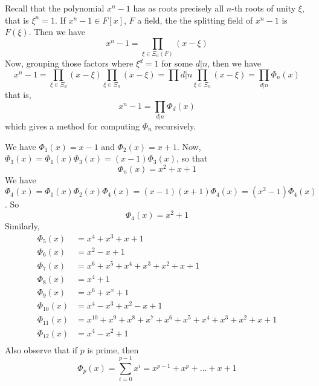 \begin{example}\label{8.18}
  Recall that the polynomial $x^n-1$ has as roots precisely all  $n$-th roots
  of unity  $\xi$, that is $\xi^n=1$. If $x^n-1 \in F[x]$, $F$ a field, the
  the splitting field of  $x^n-1$ is  $F(\xi)$. Then we have
  \begin{equation*}
    x^n-1=\prod_{\xi \in \Xi_n(F)}{(x-\xi)}
  \end{equation*}
  Now, grouping those factors where $\xi^d=1$ for some  $d|n$, then we have
  \begin{equation*}
    x^n-1=\prod_{\xi \in \Xi_d}{(x-\xi)}\prod_{\xi \in \Xi_n}{(x-\xi)}=
    \prod{d|n}{\prod_{\xi \in \Xi_n}{(x-\xi)}}=\prod_{d|n}{\Phi_n(x)}
  \end{equation*}
  that is,
  \begin{equation*}
    x^n-1=\prod_{d|n}{\Phi_d(x)}
  \end{equation*}
  which gives a method for computing $\Phi_n$ recursively.

  We have  $\Phi_1(x)=x-1$ and $\Phi_2(x)=x+1$. Now,
  $\Phi_3(x)=\Phi_1(x)\Phi_3(x)=(x-1)\Phi_3(x)$, so that
  \begin{equation*}
    \Phi_n(x)=x^2+x+1
  \end{equation*}
  We have
  $\Phi_4(x)=\Phi_1(x)\Phi_2(x)\Phi_4(x)=(x-1)(x+1)\Phi_4(x)=(x^2-1)\Phi_4(x)$.
  So
  \begin{equation*}
    \Phi_4(x)=x^2+1
  \end{equation*}
  Similarly,
  \begin{align*}
    \Phi_5(x)   &=  x^4+x^3+x+1 \\
    \Phi_6(x)   &=  x^2-x+1 \\
    \Phi_7(x)   &=  x^6+x^5+x^4+x^3+x^2+x+1 \\
    \Phi_8(x)   &= x^4+1    \\
    \Phi_9(x)   &=  x^6+x^x+1   \\
    \Phi_{10}(x)   &=   x^4-x^3+x^2-x+1 \\
    \Phi_{11}(x)   &=   x^{10}+x^9+x^8+x^7+x^6+x^5+x^4+x^3+x^2+x+1  \\
    \Phi_{12}(x)   &=   x^4-x^2+1   \\
  \end{align*}
  Also observe that if $p$ is prime, then
  \begin{equation*}
    \Phi_p(x)=\sum_{i=0}^{p-1}{x^i}=x^{p-1}+x^p+\dots+x+1
  \end{equation*}
\end{example}

